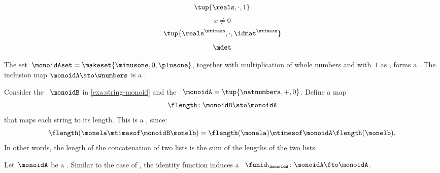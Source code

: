 {\begin{forslides}
\begin{equation}
            \label{eq:reals-times-one}
            \tup{\reals, \cdot,  1}
        \end{equation}
        \begin{equation}
            \label{eq:reals-times-one-non}
            x \neq 0
        \end{equation}
        \begin{equation}
            \label{eq:matrices-times}
            \tup{\reals^{\ntimesn}, \cdot,  \idmat^{\ntimesn}}
        \end{equation}
        \begin{equation}
            \label{eq:det}
            \mdet
        \end{equation}
    \end{forslides}
}%

\begin{example}
    The set~$\monoidAset = \makeset{ \minusone, 0, \plusone }$, together with multiplication of whole numbers and with~$1$ as , forms a .
    The inclusion map $\monoidA \sto \wnumbers$ is a .
\end{example}

\begin{example}
    \label{exa:string-length}
    Consider the ~$\monoidB$ in \cref{exa:string-monoid} and the ~$\monoidA=\tup{\natnumbers, +, 0}$.
    Define a map
    \begin{equation}
        \flength \colon \monoidB \sto \monoidA
    \end{equation}
    that maps each string to its length.
    This is a , since:
    \begin{equation}
        \flength(\monela \mtimesof\monoidB \monelb)=\flength(\monela)\mtimesof\monoidA \flength(\monelb).
    \end{equation}
    In other words, the length of the concatenation of two lists is the sum of the lengths of the two lists.
\end{example}

\begin{ctdefinition}
    \label{def:identity-mon-mor}
    Let~$\monoidA$ be a .
    Similar to the case of , the identity function induces a ~$\funid_\monoidA\colon \monoidA \fto \monoidA$.
\end{ctdefinition}

